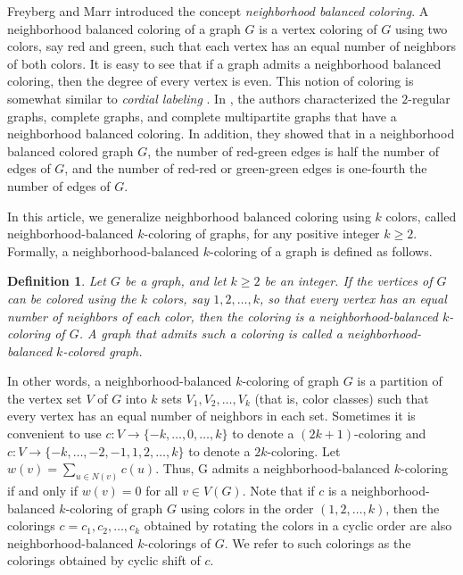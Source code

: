 \documentclass[12pt]{article}
\newtheorem{definition}[theorem]{Definition}
\newcommand{\nbc}{neighborhood-balanced $k$-coloring\xspace}
\newcommand{\nbcd}{neighborhood-balanced $k$-colored\xspace}
\begin{document}
Freyberg and Marr \cite{nbc} introduced the concept {\it neighborhood balanced coloring}.
A  neighborhood balanced coloring of a graph $G$ is a vertex coloring of $G$ using two colors, say red and green, such that each vertex has an equal number of neighbors of both colors.
It is easy to see that if a graph admits a neighborhood balanced coloring, then the degree of every vertex is even.
This notion of coloring is somewhat similar to {\it cordial labeling} \cite{cordial}.
In \cite{nbc}, the authors characterized the $2$-regular graphs, complete graphs, and complete multipartite graphs that have a neighborhood balanced coloring.
In addition, they showed that in a neighborhood balanced colored graph $G$, the number of red-green edges is half the number of edges of $G$, and the number of red-red or green-green edges is one-fourth the number of edges of $G$.

In this article, we generalize neighborhood balanced coloring using $k$ colors, called \nbc of graphs, for any positive integer $k \ge 2$.
Formally, a \nbc of a graph is defined as follows.
\begin{definition} \label{def:nbc}
    Let $G$ be a graph, and let $k \ge 2$ be an integer.
    If the vertices of $G$ can be colored using the $k$ colors, say $1, 2,\dots, k$, so that every vertex has an equal number of neighbors of each color, then the coloring is a \emph{\nbc} of $G$.
    A graph that admits such a coloring is called a \emph{\nbcd} graph.
\end{definition}

In other words, a \nbc of graph $G$ is a partition of the vertex set $V$ of $G$ into $k$ sets $V_1, V_2, \dots, V_k$ (that is, color classes) such that every vertex has an equal number of neighbors in each set.
Sometimes it is convenient to use $c\colon V\rightarrow \{-k, \dots, 0, \dots, k\}$ to denote a $(2k+1)$-coloring and $c\colon V\rightarrow \{-k, \dots,-2, -1,1, 2, \dots, k\}$ to denote a $2k$-coloring. 
Let $w(v)=\sum_{u\in N(v)}c(u)$.
Thus, G admits a \nbc if and only if $w(v)=0$ for all $v \in V(G)$.
Note that if $c$ is a \nbc of graph $G$ using colors in the order $(1, 2, \dots, k)$, then the colorings $c=c_1, c_2, \dots, c_k$ obtained by rotating the colors in a cyclic order are also neighborhood-balanced $k$-colorings of $G$.
We refer to such colorings as the colorings obtained by cyclic shift of $c$.
\end{document}
